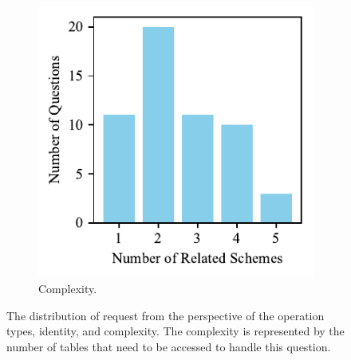 \documentclass[preprint,12pt]{elsarticle}
\begin{document}
\begin{figure}
\begin{subfigure}{0.3\textwidth}
    \includegraphics[width=\linewidth]{figs/questions_scheme_num.pdf}
    \caption{Complexity.}
    \label{fig:complexity}
  \end{subfigure}
  \caption{The distribution of request from the perspective of the operation types, identity, and complexity. The complexity is represented by the number of tables that need to be accessed to handle this question.}
\end{figure}
\end{document}
